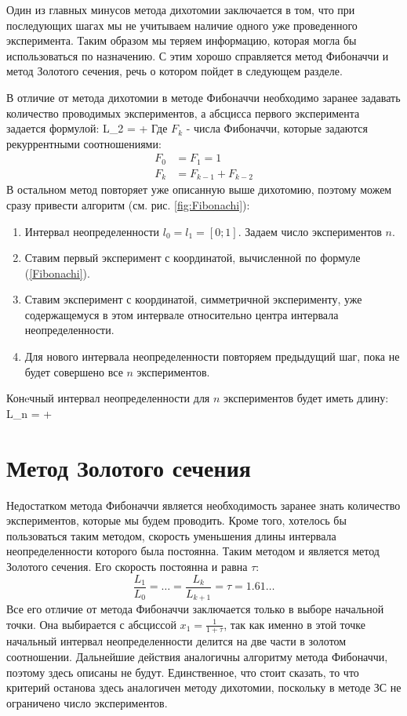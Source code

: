 Один из главных минусов метода дихотомии заключается в том, что при последующих шагах мы не учитываем наличие одного уже проведенного эксперимента. Таким образом мы теряем информацию, которая могла бы использоваться по назначению. С этим хорошо справляется метод Фибоначчи и метод Золотого сечения, речь о котором пойдет в следующем разделе. 

В отличие от метода дихотомии в методе Фибоначчи необходимо заранее задавать количество проводимых экспериментов, а абсцисса первого эксперимента задается формулой:
\be
L_2 =  + \varepsilon
\label{Fibonachi}
\ee
Где $F_k$ - числа Фибоначчи, которые задаются рекуррентными соотношениями:
\begin{align*}F_0 & {}= F_1 = 1 \\
F_k & {}= F_{k-1} + F_{k-2}\end{align*}
В остальном метод повторяет уже описанную выше дихотомию, поэтому можем сразу привести алгоритм (см. рис. \ref{fig:Fibonachi}):

\begin{enumerate}
    \item Интервал неопределенности $l_0 = l_1 = [0;1]$. Задаем число экспериментов $n$.
    \item Ставим первый эксперимент с координатой, вычисленной по формуле (\ref{Fibonachi}).
    \item Ставим эксперимент с координатой, симметричной эксперименту, уже содержащемуся в этом интервале относительно центра интервала неопределенности.
    \item Для нового интервала неопределенности повторяем предыдущий шаг, пока не будет совершено все $n$ экспериментов.
\end{enumerate}

Конeчный интервал неопределенности для $n$ экспериментов будет иметь длину:
\be
L_n =  +  \varepsilon
\ee

\section{Метод Золотого сечения}

Недостатком метода Фибоначчи является необходимость заранее знать количество экспериментов, которые мы будем проводить. Кроме того, хотелось бы пользоваться таким методом, скорость уменьшения длины интервала неопределенности которого была постоянна. Таким методом и является метод Золотого сечения. Его скорость постоянна и равна $\tau$:
\begin{equation*}
    \frac{L_1}{L_0} = \ldots = \frac{L_{k}}{L_{k+1}} = \tau = 1.61 \ldots
\end{equation*}
Все его отличие от метода Фибоначчи заключается только в выборе начальной точки. Она выбирается с абсциссой $x_1 = \frac1{1+\tau}$, так как именно в этой точке начальный интервал неопределенности делится на две части в золотом соотношении. Дальнейшие действия аналогичны алгоритму метода Фибоначчи, поэтому здесь описаны не будут. Единственное, что стоит сказать, то что критерий останова здесь аналогичен методу дихотомии, поскольку в методе ЗС не ограничено число экспериментов.

